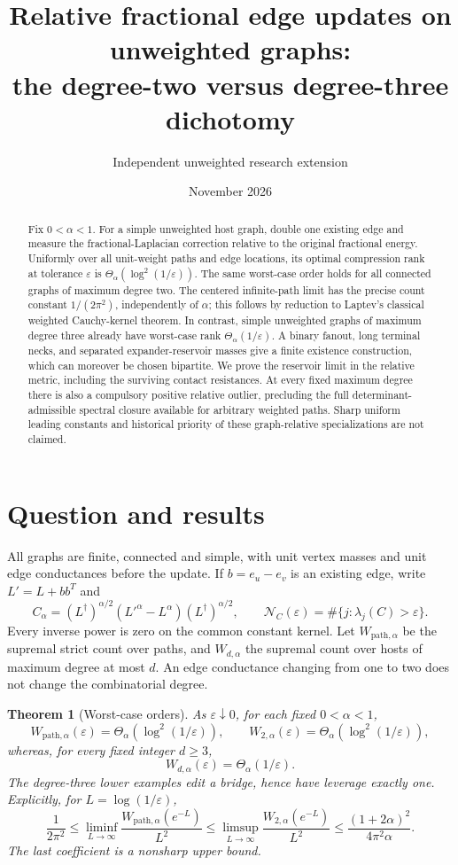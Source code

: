 \documentclass[11pt]{article}
\title{Relative fractional edge updates on unweighted graphs:\\
the degree-two versus degree-three dichotomy}
\author{Independent unweighted research extension}
\date{November 2026}
\newtheorem{theorem}{Theorem}[section]
\newcommand{\N}{\mathcal N}
\begin{document}
\maketitle
\begin{abstract}
Fix $0<\alpha<1$. For a simple unweighted host graph, double one existing
edge and measure the fractional-Laplacian correction relative to the
original fractional energy. Uniformly over all unit-weight paths and
edge locations, its optimal compression rank at tolerance $\varepsilon$
is $\Theta_\alpha(\log^2(1/\varepsilon))$. The same worst-case order holds
for all connected graphs of maximum degree two. The centered infinite-path
limit has the precise count constant $1/(2\pi^2)$, independently of
$\alpha$; this follows by reduction to Laptev's classical weighted
Cauchy-kernel theorem. In contrast, simple unweighted graphs of maximum
degree three already have worst-case rank
$\Theta_\alpha(1/\varepsilon)$. A binary fanout, long terminal necks,
and separated expander-reservoir masses give a finite existence
construction, which can moreover be chosen bipartite.
We prove the reservoir limit in the relative metric,
including the surviving contact resistances. At every fixed maximum
degree there is also a compulsory positive relative outlier, precluding
the full determinant-admissible spectral closure available for arbitrary
weighted paths. Sharp uniform leading constants and historical priority
of these graph-relative specializations are not claimed.
\end{abstract}

\section{Question and results}
All graphs are finite, connected and simple, with unit vertex masses
and unit edge conductances before the update. If $b=e_u-e_v$ is an
existing edge, write $L'=L+bb^T$ and
\[
 C_\alpha=(L^\dagger)^{\alpha/2}(L'^\alpha-L^\alpha)
                                      (L^\dagger)^{\alpha/2},\qquad
 \N_C(\varepsilon)=\#\{j:\lambda_j(C)>\varepsilon\}.
\]
Every inverse power is zero on the common constant kernel. Let
$W_{\mathrm{path},\alpha}$ be the supremal strict count over paths,
and $W_{d,\alpha}$ the supremal count over hosts of maximum degree at
most $d$. An edge conductance changing from one to two does not change
the combinatorial degree.

\begin{theorem}[Worst-case orders]\label{thm:main}
As $\varepsilon\downarrow0$, for each fixed $0<\alpha<1$,
\[
 W_{\mathrm{path},\alpha}(\varepsilon)
   =\Theta_\alpha(\log^2(1/\varepsilon)),\qquad
 W_{2,\alpha}(\varepsilon)
   =\Theta_\alpha(\log^2(1/\varepsilon)),
\]
whereas, for every fixed integer $d\ge3$,
\[
 W_{d,\alpha}(\varepsilon)=\Theta_\alpha(1/\varepsilon).
\]
The degree-three lower examples edit a bridge, hence have leverage
exactly one. Explicitly, for $L=\log(1/\varepsilon)$,
\[
 \frac1{2\pi^2}
 \le\liminf_{L\to\infty}\frac{W_{\mathrm{path},\alpha}(e^{-L})}{L^2}
 \le\limsup_{L\to\infty}\frac{W_{2,\alpha}(e^{-L})}{L^2}
 \le\frac{(1+2\alpha)^2}{4\pi^2\alpha}.
\]
The last coefficient is a nonsharp upper bound.
\end{theorem}
\end{document}
